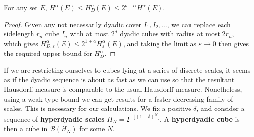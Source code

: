 \begin{theorem}
    For any set $E$, $H^\alpha(E) \leq H^\alpha_D(E) \leq 2^{d + \alpha} H^\alpha(E)$.
\end{theorem}
\begin{proof}
    Given any not necessarily dyadic cover $I_1, I_2, \dots$, we can replace each sidelength $r_n$ cube $I_n$ with at most $2^d$ dyadic cubes with radius at most $2r_n$, which gives $H^\alpha_{D,\varepsilon}(E) \leq 2^{1 + \alpha} H^\alpha_\varepsilon(E)$, and taking the limit as $\varepsilon \to 0$ then gives the required upper bound for $H^\alpha_D$.
\end{proof}

If we are restricting ourselves to cubes lying at a series of discrete scales, it seems as if the dyadic sequence is about as fast as we can use so that the resultant Hausdorff measure is comparable to the usual Hausdorff measure. Nonetheless, using a weak type bound we can get results for a faster decreasing family of scales. This is necessary for our calculations. We fix a positive $\delta$, and consider a sequence of {\bf hyperdyadic scales} $H_N = 2^{- \lfloor (1 + \delta)^N \rfloor}$. A {\bf hyperdyadic cube} is then a cube in $\mathcal{B}(H_N)$ for some $N$.


